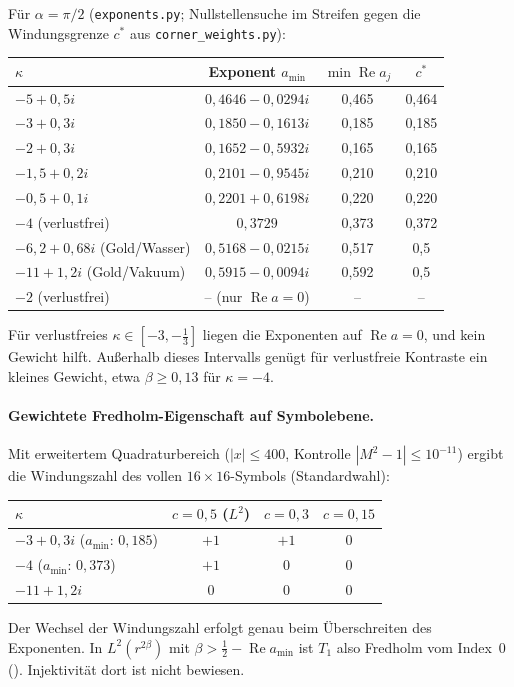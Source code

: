 \documentclass[11pt, a4paper]{article}
\theoremstyle{plain}
\theoremstyle{definition}
\newcommand{\status}[1]{\hfill{\small\sffamily[#1]}}
\begin{document}
Für $\alpha=\pi/2$ (\texttt{exponents.py}; Nullstellensuche im Streifen gegen die
Windungsgrenze $c^*$ aus \texttt{corner\_weights.py}):
\begin{center}\small
\begin{tabular}{lccc}
\toprule
$\kappa$ & Exponent $a_{\min}$ & $\min\operatorname{Re}a_j$ & $c^*$\\
\midrule
$-5+0{,}5i$ & $0{,}4646-0{,}0294i$ & 0,465 & 0,464\\
$-3+0{,}3i$ & $0{,}1850-0{,}1613i$ & 0,185 & 0,185\\
$-2+0{,}3i$ & $0{,}1652-0{,}5932i$ & 0,165 & 0,165\\
$-1{,}5+0{,}2i$ & $0{,}2101-0{,}9545i$ & 0,210 & 0,210\\
$-0{,}5+0{,}1i$ & $0{,}2201+0{,}6198i$ & 0,220 & 0,220\\
$-4$ (verlustfrei) & $0{,}3729$ & 0,373 & 0,372\\
$-6{,}2+0{,}68i$ (Gold/Wasser) & $0{,}5168-0{,}0215i$ & 0,517 & 0,5\\
$-11+1{,}2i$ (Gold/Vakuum) & $0{,}5915-0{,}0094i$ & 0,592 & 0,5\\
$-2$ (verlustfrei) & -- (nur $\operatorname{Re}a=0$) & -- & --\\
\bottomrule
\end{tabular}
\end{center}
Für verlustfreies $\kappa\in[-3,-\tfrac13]$ liegen die Exponenten auf
$\operatorname{Re}a=0$, und kein Gewicht hilft. Außerhalb dieses Intervalls genügt
für verlustfreie Kontraste ein kleines Gewicht, etwa $\beta\ge0{,}13$ für
$\kappa=-4$.

\paragraph{Gewichtete Fredholm-Eigenschaft auf Symbolebene.} Mit erweitertem
Quadraturbereich ($|x|\le400$, Kontrolle $|M^2-1|\le10^{-11}$) ergibt die
Windungszahl des vollen $16\times16$-Symbols (Standardwahl):
\begin{center}\small
\begin{tabular}{lccc}
\toprule
$\kappa$ & $c=0{,}5$ ($L^2$) & $c=0{,}3$ & $c=0{,}15$\\
\midrule
$-3+0{,}3i$ ($a_{\min}$: $0{,}185$) & $+1$ & $+1$ & $0$\\
$-4$ ($a_{\min}$: $0{,}373$) & $+1$ & $0$ & $0$\\
$-11+1{,}2i$ & $0$ & $0$ & $0$\\
\bottomrule
\end{tabular}
\end{center}
Der Wechsel der Windungszahl erfolgt genau beim Überschreiten des Exponenten. In
$L^2(r^{2\beta})$ mit $\beta>\tfrac12-\operatorname{Re}a_{\min}$ ist $T_1$ also
Fredholm vom Index~0 (\status{Symbolebene}). Injektivität dort ist nicht bewiesen.
\end{document}
